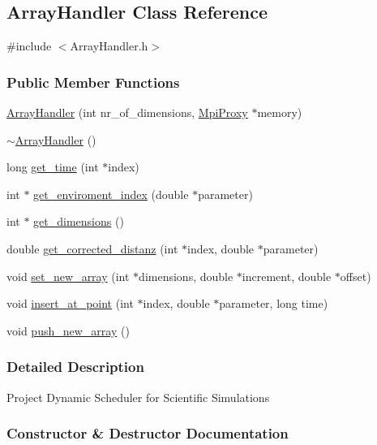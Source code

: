 \hypertarget{a00005}{}\subsection{Array\+Handler Class Reference}
\label{a00005}


{\ttfamily \#include $<$Array\+Handler.\+h$>$}

\subsubsection*{Public Member Functions}
\begin{DoxyCompactItemize}
\item 
\hyperlink{a00005_a1beed0e1215e2a5b719aaf3bca8de751}{Array\+Handler} (int nr\+\_\+of\+\_\+dimensions, \hyperlink{a00027}{Mpi\+Proxy} $\ast$memory)
\item 
\hyperlink{a00005_a3e1713135553642fb86bad1ad8be0d31}{$\sim$\+Array\+Handler} ()
\item 
long \hyperlink{a00005_ae540ed162a064c68836437debb910dbb}{get\+\_\+time} (int $\ast$index)
\item 
int $\ast$ \hyperlink{a00005_a42ee7a07ea9091d711f4b701048d8bf2}{get\+\_\+enviroment\+\_\+index} (double $\ast$parameter)
\item 
int $\ast$ \hyperlink{a00005_ad4deff08a547191d984483180de3abd8}{get\+\_\+dimensions} ()
\item 
double \hyperlink{a00005_a6e54f132273c2191fc733c54f5e55e9c}{get\+\_\+corrected\+\_\+distanz} (int $\ast$index, double $\ast$parameter)
\item 
void \hyperlink{a00005_ab4a4cf85c84bd50c5f1e8b79c01e3971}{set\+\_\+new\+\_\+array} (int $\ast$dimensions, double $\ast$increment, double $\ast$offset)
\item 
void \hyperlink{a00005_ad9ff7602030d957f9bfcaf22673791ca}{insert\+\_\+at\+\_\+point} (int $\ast$index, double $\ast$parameter, long time)
\item 
void \hyperlink{a00005_a7be7ad49143fd8d10bd027d14cfe9f2a}{push\+\_\+new\+\_\+array} ()
\end{DoxyCompactItemize}


\subsubsection{Detailed Description}
Project Dynamic Scheduler for Scientific Simulations 

\subsubsection{Constructor \& Destructor Documentation}
\hypertarget{a00005_a1beed0e1215e2a5b719aaf3bca8de751}{}
